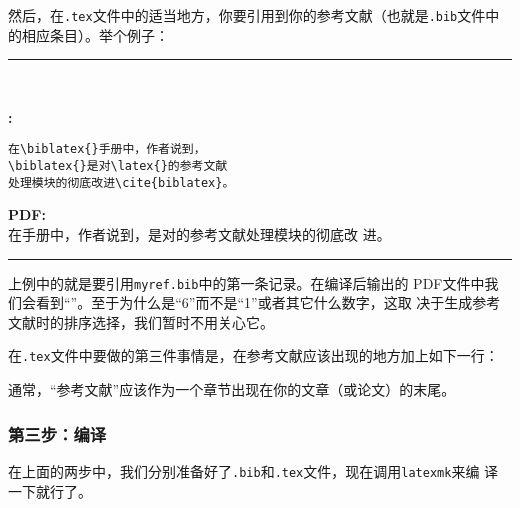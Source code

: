 然后，在\texttt{.tex}文件中的适当地方，你要引用到你的参考文献（也就是\texttt{.bib}文件中
的相应条目）。举个例子：

\rule{.9\textwidth}{.4pt}\\[-5ex]
\singlespacing
\begin{minipage}[t]{.45\linewidth}
  \textbf{\latex:}
  \begin{verbatim}
在\biblatex{}手册中，作者说到，
\biblatex{}是对\latex{}的参考文献
处理模块的彻底改进\cite{biblatex}。
\end{verbatim}
\end{minipage}
\hfill\vline\hfill
\begin{minipage}[t]{.45\linewidth}
  \textbf{PDF:}\\[1.5ex]  
  在\biblatex{}手册中，作者说到，\biblatex{}是对\latex{}的参考文献处理模块的彻底改
  进\cite{biblatex}。
\end{minipage}
\begin{center}
\rule{0.9\textwidth}{.1pt}
\end{center}
\doublespacing

上例中的就是要引用\texttt{myref.bib}中的第一条记录。在编译后输出的
PDF文件中我们会看到“\cite{biblatex}”。至于为什么是“6”而不是“1”或者其它什么数字，这取
决于生成参考文献时的排序选择，我们暂时不用关心它。

在\texttt{.tex}文件中要做的第三件事情是，在参考文献应该出现的地方加上如下一行：

\begin{codeblock}
\begin{latexcode}
\printbibliography{}
\end{latexcode}
\end{codeblock}

通常，“参考文献”应该作为一个章节出现在你的文章（或论文）的末尾。

\subsubsection{第三步：编译}

在上面的两步中，我们分别准备好了\texttt{.bib}和\texttt{.tex}文件，现在调用\texttt{latexmk}来编
译一下就行了。

